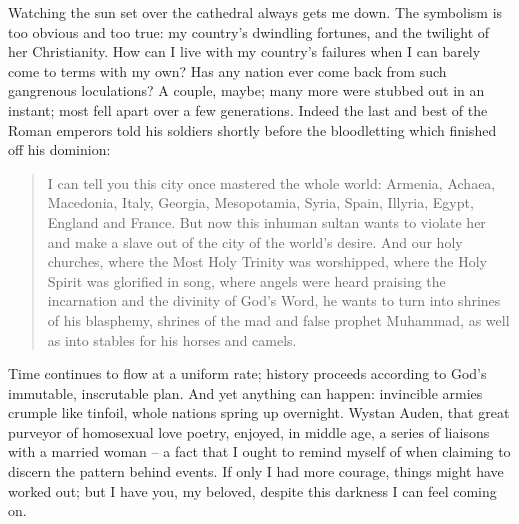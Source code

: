 Watching the sun set over the cathedral always gets me down. The symbolism is too obvious and too true: my country's dwindling fortunes, and the twilight of her Christianity. How can I live with my country's failures when I can barely come to terms with my own? Has any nation ever come back from such gangrenous loculations? A couple, maybe; many more were stubbed out in an instant; most fell apart over a few generations. Indeed the last and best of the Roman emperors told his soldiers shortly before the bloodletting which finished off his dominion:

\begin{quote}
    I can tell you this city once mastered the whole world: Armenia, Achaea, Macedonia, Italy, Georgia, Mesopotamia, Syria, Spain, Illyria, Egypt, England and France. But now this inhuman sultan wants to violate her and make a slave out of the city of the world's desire. And our holy churches, where the Most Holy Trinity was worshipped, where the Holy Spirit was glorified in song, where angels were heard praising the incarnation and the divinity of God's Word, he wants to turn into shrines of his blasphemy, shrines of the mad and false prophet Muhammad, as well as into stables for his horses and camels.
\end{quote}

Time continues to flow at a uniform rate; history proceeds according to God's immutable, inscrutable plan. And yet anything can happen: invincible armies crumple like tinfoil, whole nations spring up overnight. Wystan Auden, that great purveyor of homosexual love poetry, enjoyed, in middle age, a series of liaisons with a married woman -- a fact that I ought to remind myself of when claiming to discern the pattern behind events. If only I had more courage, things might have worked out; but I have you, my beloved, despite this darkness I can feel coming on.

